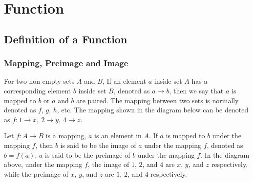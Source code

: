 \documentclass[12pt]{report}
\begin{document}
\doublespacing{}
\tableofcontents
\singlespacing{}
\newpage


\chapter{Function}

\section{Definition of a Function}
\subsection*{Mapping, Preimage and Image}

\begin{multicols}{2}

  For two non-empty sets $A$ and $B$, If an element $a$ inside set $A$ has a
  corresponding element $b$ inside set $B$, denoted as $a \to b$, then we say
  that $a$ is mapped to $b$ or $a$ and $b$ are paired. The mapping between two
  sets is normally denoted as $f$, $g$, $h$, etc. The mapping shown in the
  diagram below can be denoted as $f:1 \to x,\ 2 \to y,\ 4 \to z$.
  \begin{center}
  \end{center}
\end{multicols}

Let $f:A \to B$ is a mapping, $a$ is an element in $A$. If $a$ is mapped to $b$
under the mapping $f$, then $b$ is said to be the image of $a$ under the
mapping $f$, denoted as $b = f(a)$; $a$ is said to be the preimage of $b$ under
the mapping $f$. In the diagram above, under the mapping $f$, the image of $1$,
$2$, and $4$ are $x$, $y$, and $z$ respectively, while the preimage of $x$,
$y$, and $z$ are $1$, $2$, and $4$ respectively.
\end{document}
